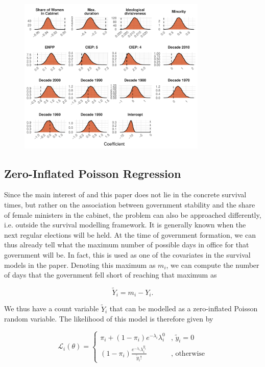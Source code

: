 \begin{figure}
    \centering
    \includegraphics[width = 0.8\textwidth]{figures/fig1_weib_coefplot.pdf}
\end{figure}


\subsection{Zero-Inflated Poisson Regression}
Since the main interest of \textcite{KK20} and this paper does not lie in the concrete survival times, but rather on the association between government stability and the share of female ministers in the cabinet, the problem can also be approached differently, i.e. outside the survival modelling framework. It is generally known when the next regular elections will be held. At the time of government formation, we can thus already tell what the maximum number of possible days in office for that government will be. In fact, this is used as one of the covariates in the survival models in the paper. Denoting this maximum as $m_i$, we can compute the number of days that the government fell short of reaching that maximum as 

\begin{equation*}
    \widetilde{Y}_i = m_i - Y_i.
\end{equation*}

We thus have a count variable $\widetilde{Y}_i$ that can be modelled as a zero-inflated Poisson random variable. The likelihood of this model is therefore given by 

\begin{equation*}
    \mathcal{L}_i(\theta) = \begin{cases}
    \pi_i + (1-\pi_i) e^{-\lambda_i} \lambda_i^{0} & \text{, $\tilde{y}_i = 0$} \\
    (1-\pi_i) \frac{e^{-\lambda_i} \lambda_i^{y_i}}{\tilde{y}_i!} & \text{, otherwise}
    \end{cases}
\end{equation*}

